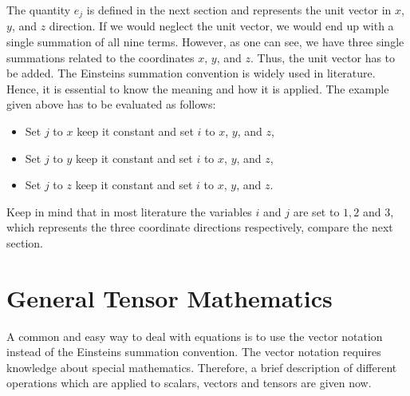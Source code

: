 %
%
    The quantity $e_j$ is defined in the next section and represents the unit
    vector in $x$, $y$, and $z$ direction. If we would neglect the unit vector,
    we would end up with a single summation of all nine terms. However, as one can
    see, we have three single summations related to the coordinates $x$, $y$,
    and $z$. Thus, the unit vector has to be added.
    The Einsteins summation convention is widely used in literature.
    Hence, it is essential to know the meaning and how it is applied. The
    example given above has to be evaluated as follows:
%
%
\begin{itemize}
    \item Set $j$ to $x$ keep it constant and set $i$ to $x$, $y$, and $z$,
    \item Set $j$ to $y$ keep it constant and set $i$ to $x$, $y$, and $z$,
    \item Set $j$ to $z$ keep it constant and set $i$ to $x$, $y$, and $z$.
\end{itemize}
%
%
    Keep in mind that in most literature the variables $i$ and $j$ are set to
    $1, 2$ and $3$, which represents the three coordinate directions
    respectively, compare the next section.
%
%
\section{General Tensor Mathematics}
%
%
	A common and easy way to deal with equations is to use the vector notation
    instead of the Einsteins summation convention. The vector notation requires
    knowledge about special mathematics. Therefore, a brief description of
    different operations which are applied to scalars, vectors and tensors
    are given now.


